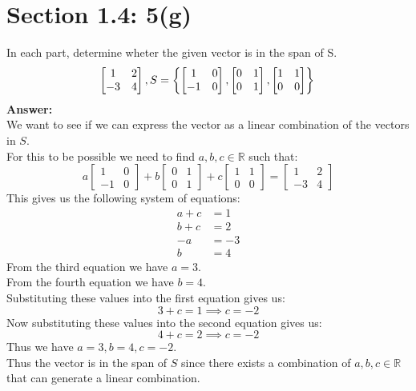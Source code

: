 \documentclass{article}
\begin{document}
\section*{Section 1.4: 5(g)}
In each part, determine wheter the given vector is in the span of S.
$$ \begin{bmatrix}
    1 & 2 \\
    -3 & 4
\end{bmatrix}, S = \left\{ \begin{bmatrix}
    1 & 0 \\
    -1 & 0
\end{bmatrix}, \begin{bmatrix}
    0 & 1 \\
    0 & 1
\end{bmatrix}, \begin{bmatrix}
    1 & 1 \\
    0 & 0
\end{bmatrix}
\right\}\\
$$
\textbf{Answer:} \\
We want to see if we can express the vector as a linear combination of the vectors in $S$.\\
For this to be possible we need to find $a,b,c \in \mathds{R}$ such that:
$$ a \begin{bmatrix}
    1 & 0 \\
    -1 & 0
\end{bmatrix} + b \begin{bmatrix}
    0 & 1 \\
    0 & 1
\end{bmatrix} + c \begin{bmatrix}
    1 & 1 \\
    0 & 0
\end{bmatrix} = \begin{bmatrix}
    1 & 2 \\
    -3 & 4
\end{bmatrix}$$
This gives us the following system of equations:
\begin{align*}
    a + c &= 1 \\
    b + c &= 2 \\
    -a &= -3 \\
    b &= 4
\end{align*}
From the third equation we have $a = 3$.\\
From the fourth equation we have $b = 4$.\\
Substituting these values into the first equation gives us:
$$ 3 + c = 1 \implies c = -2$$
Now substituting these values into the second equation gives us:
$$ 4 + c = 2 \implies c = -2$$
Thus we have $a = 3, b = 4, c = -2$.\\
Thus the vector is in the span of $S$ since there exists a combination of $a,b,c \in \mathds{R}$ that can generate a linear combination.\\
\end{document}
